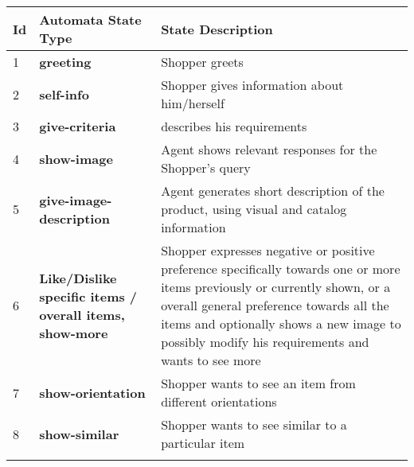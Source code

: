 \documentclass[letterpaper]{article} %
\begin{document}
\begin{table}[t]
{%
{\scriptsize
\captionsetup{font=small}
\begin{center}
\begin{tabular}{|p{0.3cm}|p{1.3cm}|p{5.5cm}|}
\hline
\textbf{Id}&\textbf{Automata State Type} & \textbf{State Description}\\ \hline
1 &\textbf{greeting} & Shopper greets \\ \Xhline{2\arrayrulewidth} 
2 &\textbf{self-info} & Shopper gives information about him/herself \\  \Xhline{2\arrayrulewidth} 
3 & \textbf{give-criteria} &  describes his requirements\\  \Xhline{2\arrayrulewidth} 
4 &\textbf{show-image} & Agent shows relevant responses for the Shopper's query\\  \Xhline{2\arrayrulewidth} 
5 & \textbf{give-image-description} & Agent generates short description of the product, using visual and catalog information\\ \Xhline{2\arrayrulewidth} 
6 & \textbf{Like/Dislike specific items / overall items, show-more} & 
Shopper expresses negative or positive preference specifically towards one or more items previously or currently shown, or a overall general preference towards all the items and optionally shows a new image to possibly modify his requirements and wants to see more \\ \Xhline{2\arrayrulewidth} 
7 & \textbf{show-orientation} & Shopper wants to see an item from different orientations\\  \Xhline{2\arrayrulewidth} 
8 & \textbf{show-similar} & Shopper wants to see similar to a particular item\\  \Xhline{2\arrayrulewidth} 

\end{tabular}
\end{center}}}
\end{table}
\end{document}
